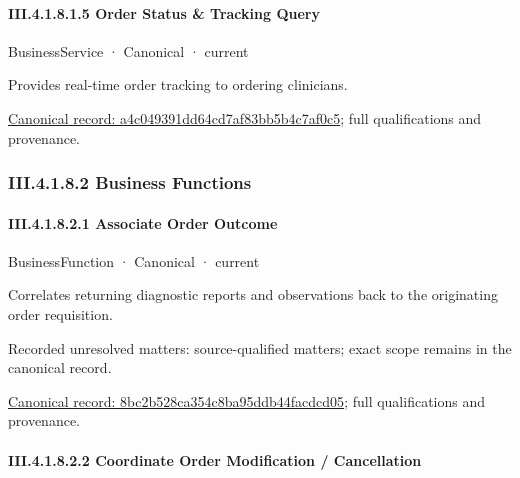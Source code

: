\paragraph*{III.4.1.8.1.5 Order Status \& Tracking Query}
\label{navigation:III.4.1.8.1.5}

\label{element:a4c049391dd64cd7af83bb5b4c7af0c5}
{\small BusinessService · Canonical · current}\par

Provides real-time order tracking to ordering clinicians.


{\footnotesize \href{../../../../../../../continuum/business/business-service/a4c049391dd64cd7af83bb5b4c7af0c5.md}{Canonical record: a4c049391dd64cd7af83bb5b4c7af0c5}; full qualifications and provenance.}\par
\subsubsection*{III.4.1.8.2 Business Functions}
\label{navigation:III.4.1.8.2}

\paragraph*{III.4.1.8.2.1 Associate Order Outcome}
\label{navigation:III.4.1.8.2.1}

\label{element:8bc2b528ca354c8ba95ddb44facdcd05}
{\small BusinessFunction · Canonical · current}\par

Correlates returning diagnostic reports and observations back to the originating order requisition.


{\small Recorded unresolved matters: source-qualified matters; exact scope remains in the canonical record.}\par
{\footnotesize \href{../../../../../../../continuum/business/business-function/8bc2b528ca354c8ba95ddb44facdcd05.md}{Canonical record: 8bc2b528ca354c8ba95ddb44facdcd05}; full qualifications and provenance.}\par
\paragraph*{III.4.1.8.2.2 Coordinate Order Modification / Cancellation}
\label{navigation:III.4.1.8.2.2}

